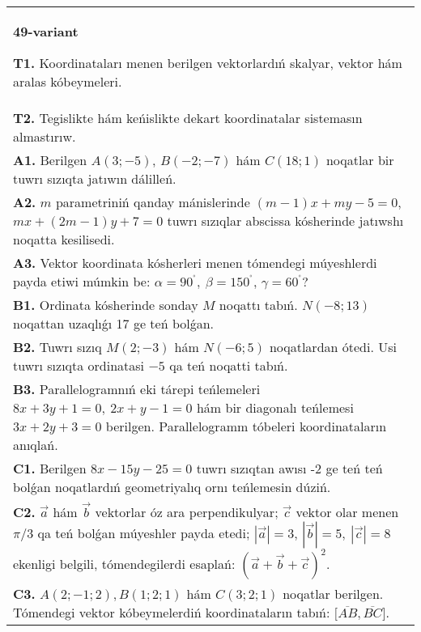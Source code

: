 \documentclass{article}
\begin{document}
\begin{tabular}{m{17cm}}
\textbf{49-variant}

\textbf{T1.} 
Koordinataları menen berilgen vektorlardıń skalyar, vektor hám aralas kóbeymeleri.
 \\
\textbf{T2.} 
Tegislikte hám keńislikte dekart koordinatalar sistemasın almastırıw.
 \\
\textbf{A1.} 
Berilgen $A (3; -5) $, $B (-2; -7) $ hám
$C (18; 1) $ noqatlar bir tuwrı sızıqta jatıwın dálilleń.
 \\
\textbf{A2.} 
$m$ parametriniń qanday mánislerinde
$ (m-1) x+my-5=0$, $mx+ (2m-1) y+7=0$ tuwrı sızıqlar abscissa
kósherinde jatıwshı noqatta kesilisedi.
 \\
\textbf{A3.} 
Vektor koordinata kósherleri menen tómendegi múyeshlerdi payda etiwi
múmkin be: $\alpha = 90^{{^\circ}},\ \beta = 150^{{^\circ}}$,
$\gamma = 60^{{^\circ}}?$
 \\
\textbf{B1.} 
Ordinata kósherinde sonday $M$ noqattı tabıń.
\(N (-8;13) \) noqattan uzaqlıǵı 17 ge teń bolǵan.
 \\
\textbf{B2.} 
Tuwrı sızıq \(M (2;-3) \) hám \(N (-6;5) \) noqatlardan ótedi.
Usi tuwrı sızıqta ordinatasi $-5$ qa teń noqatti tabıń.
 \\
\textbf{B3.} 
Parallelogramnıń eki tárepi teńlemeleri
\(8x+3y+1=0,\ 2x+y-1=0\) hám bir diagonalı teńlemesi
\(3x+2y+3=0\) berilgen. Parallelogramm tóbeleri koordinataların
anıqlań.
 \\
\textbf{C1.} 
Berilgen \(8x-15y-25=0\) tuwrı sızıqtan awısı -2 ge teń
teń bolǵan noqatlardıń geometriyalıq ornı teńlemesin dúziń.
 \\
\textbf{C2.} 
$\vec{a}$ hám $\vec{b}$ vektorlar óz ara perpendikulyar; $\vec{c}$ vektor olar menen $\pi/3$ qa teń bolǵan múyeshler payda etedi; $|\vec{a}| = 3$, $|\vec{b}| = 5,\ |\vec{c}| = 8$ ekenligi belgili, tómendegilerdi esaplań:
$ (\vec{a} + \vec{b} + \vec{c}) ^{2}$.
 \\
\textbf{C3.} 
$A (2; -1;2), B (1;2; 1) $ hám $C (3;2;1) $ noqatlar berilgen. Tómendegi vektor kóbeymelerdiń koordinataların tabıń:
$\lbrack\overline{AB},\overline{BC}\rbrack$.
 \\

\end{tabular}
\vspace{1cm}
\end{document}
